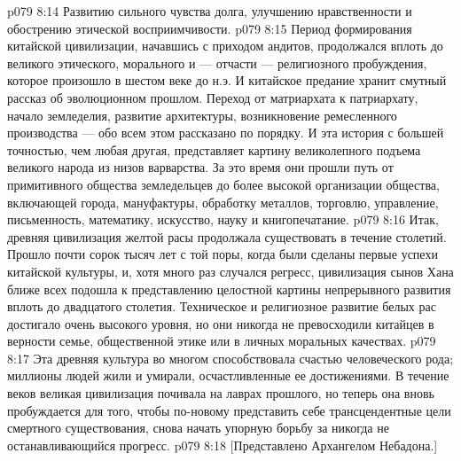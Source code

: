 \vs p079 8:14 \bibnobreakspace Развитию сильного чувства долга, улучшению нравственности и обострению этической восприимчивости.
\vs p079 8:15 \pc Период формирования китайской цивилизации, начавшись с приходом андитов, продолжался вплоть до великого этического, морального и --- отчасти --- религиозного пробуждения, которое произошло в шестом веке до н.э. И китайское предание хранит смутный рассказ об эволюционном прошлом. Переход от матриархата к патриархату, начало земледелия, развитие архитектуры, возникновение ремесленного производства --- обо всем этом рассказано по порядку. И эта история с большей точностью, чем любая другая, представляет картину великолепного подъема великого народа из низов варварства. За это время они прошли путь от примитивного общества земледельцев до более высокой организации общества, включающей города, мануфактуры, обработку металлов, торговлю, управление, письменность, математику, искусство, науку и книгопечатание.
\vs p079 8:16 Итак, древняя цивилизация желтой расы продолжала существовать в течение столетий. Прошло почти сорок тысяч лет с той поры, когда были сделаны первые успехи китайской культуры, и, хотя много раз случался регресс, цивилизация сынов Хана ближе всех подошла к представлению целостной картины непрерывного развития вплоть до двадцатого столетия. Техническое и религиозное развитие белых рас достигало очень высокого уровня, но они никогда не превосходили китайцев в верности семье, общественной этике или в личных моральных качествах.
\vs p079 8:17 Эта древняя культура во многом способствовала счастью человеческого рода; миллионы людей жили и умирали, осчастливленные ее достижениями. В течение веков великая цивилизация почивала на лаврах прошлого, но теперь она вновь пробуждается для того, чтобы по\hyp{}новому представить себе трансцендентные цели смертного существования, снова начать упорную борьбу за никогда не останавливающийся прогресс.
\vsetoff
\vs p079 8:18 [Представлено Архангелом Небадона.]
